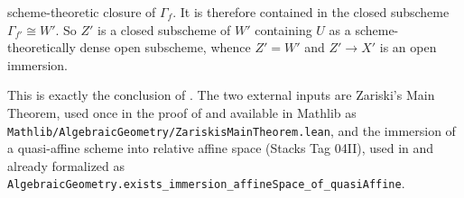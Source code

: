 \begin{remark}
\begin{enumerate}
      scheme-theoretic closure of $\Gamma_f$.  It is therefore contained in
      the closed subscheme $\Gamma_{f'}\cong W'$.  So $Z'$ is a closed
      subscheme of $W'$ containing $U$ as a scheme-theoretically dense open
      subscheme, whence $Z'=W'$ and $Z'\to X'$ is an open immersion.
  \end{enumerate}
  This is exactly the conclusion of
  .  The two external inputs are
  Zariski's Main Theorem, used once in the proof of
   and available in Mathlib as
  \texttt{Mathlib/AlgebraicGeometry/ZariskisMainTheorem.lean}, and the
  immersion of a quasi-affine scheme into relative affine space (Stacks Tag
  04II), used in  and
  already formalized as
  \texttt{AlgebraicGeometry.exists\_immersion\_affineSpace\_of\_quasiAffine}.
\end{remark}
